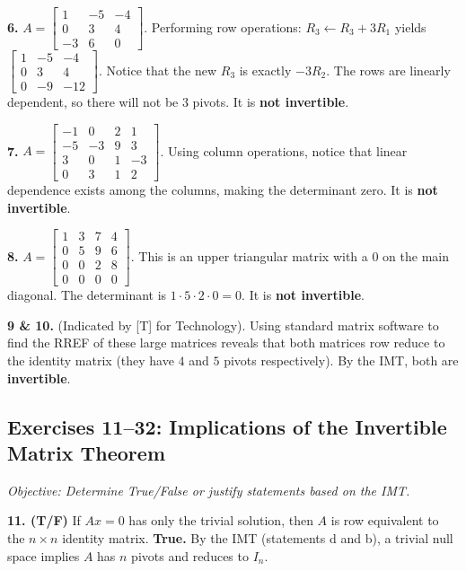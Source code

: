 \documentclass[11pt]{article}
\begin{document}
\textbf{6.} $A = \begin{bmatrix} 1 & -5 & -4 \\ 0 & 3 & 4 \\ -3 & 6 & 0 \end{bmatrix}$. 
Performing row operations: $R_3 \leftarrow R_3 + 3R_1$ yields $\begin{bmatrix} 1 & -5 & -4 \\ 0 & 3 & 4 \\ 0 & -9 & -12 \end{bmatrix}$. Notice that the new $R_3$ is exactly $-3R_2$. The rows are linearly dependent, so there will not be 3 pivots. It is \textbf{not invertible}.

\textbf{7.} $A = \begin{bmatrix} -1 & 0 & 2 & 1 \\ -5 & -3 & 9 & 3 \\ 3 & 0 & 1 & -3 \\ 0 & 3 & 1 & 2 \end{bmatrix}$. 
Using column operations, notice that linear dependence exists among the columns, making the determinant zero. It is \textbf{not invertible}.

\textbf{8.} $A = \begin{bmatrix} 1 & 3 & 7 & 4 \\ 0 & 5 & 9 & 6 \\ 0 & 0 & 2 & 8 \\ 0 & 0 & 0 & 0 \end{bmatrix}$. 
This is an upper triangular matrix with a $0$ on the main diagonal. The determinant is $1 \cdot 5 \cdot 2 \cdot 0 = 0$. It is \textbf{not invertible}.

\textbf{9 \& 10.} (Indicated by [T] for Technology). Using standard matrix software to find the RREF of these large matrices reveals that both matrices row reduce to the identity matrix (they have $4$ and $5$ pivots respectively). By the IMT, both are \textbf{invertible}.

\subsection*{Exercises 11--32: Implications of the Invertible Matrix Theorem}
\textit{Objective: Determine True/False or justify statements based on the IMT.}

\textbf{11. (T/F)} If $Ax=0$ has only the trivial solution, then $A$ is row equivalent to the $n \times n$ identity matrix.
\textbf{True.} By the IMT (statements d and b), a trivial null space implies $A$ has $n$ pivots and reduces to $I_n$.
\end{document}

